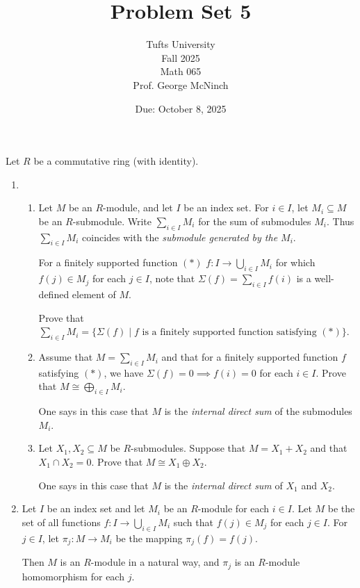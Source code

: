\documentclass{article}
\title{Problem Set 5}
\author{Tufts University \\ Fall 2025 \\ Math 065 \\ Prof. George McNinch}
\date{Due: October 8, 2025}
\begin{document}
\maketitle



Let $R$ be a commutative ring (with identity).

\begin{enumerate}

\item 
\begin{enumerate}[label=\alph*.]
    \item Let $M$ be an $R$-module, and let $I$ be an index set. For $i \in I$, let $M_i \subseteq M$ be an $R$-submodule. Write $\sum_{i \in I} M_i$ for the sum of submodules $M_i$. Thus $\sum_{i \in I} M_i$ coincides with the \emph{submodule generated by the $M_i$}.

    For a finitely supported function $(*)$ $f:I \to \bigcup_{i \in I} M_i$ for which $f(j) \in M_j$ for each $j \in I$, note that $\Sigma(f) = \sum_{i \in I} f(i)$ is a well-defined element of $M$.

    Prove that $\sum_{i \in I} M_i = \{ \Sigma(f) \mid f \text{ is a finitely supported function satisfying } (*) \}$.

    \item Assume that $M = \sum_{i \in I} M_i$ and that for a finitely supported function $f$ satisfying $(*)$, we have $\Sigma(f) = 0 \implies f(i) = 0$ for each $i \in I$. Prove that $M \cong \bigoplus_{i \in I} M_i$.

    One says in this case that $M$ is the \emph{internal direct sum} of the submodules $M_i$.

    \item Let $X_1, X_2 \subseteq M$ be $R$-submodules. Suppose that $M = X_1 + X_2$ and that $X_1 \cap X_2 = 0$. Prove that $M \cong X_1 \oplus X_2$.

    One says in this case that $M$ is the \emph{internal direct sum} of $X_1$ and $X_2$.
\end{enumerate}

\item 
Let $I$ be an index set and let $M_i$ be an $R$-module for each $i \in I$. Let $M$ be the set of all functions $f:I \to \bigcup_{i \in I} M_i$ such that $f(j) \in M_j$ for each $j \in I$. For $j \in I$, let $\pi_j:M \to M_i$ be the mapping $\pi_j(f) = f(j)$.

Then $M$ is an $R$-module in a natural way, and $\pi_j$ is an $R$-module homomorphism for each $j$.


\end{enumerate}
\end{document}
